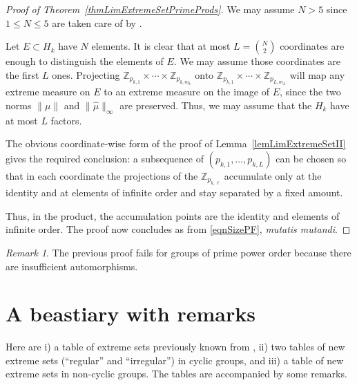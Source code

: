 \documentclass[letter,11pt]{amsart}
\numberwithin{theorem}{section}
\theoremstyle{remark}
\newtheorem{rem}[theorem]{Remark}
\numberwithin{equation}{section}
\newcommand{\lemref}[1]{Lemma~\ref{#1}}
\newcommand{\thmref}[1]{Theorem~\ref{#1}}
\newcommand\Zp[2]{\texttt{$\mathbb Z_{#1}^{\	#2}$}}
\begin{document}
\begin{proof}[Proof of \thmref{thmLimExtremeSetPrimeProds}]
We may assume $N>5$ since $1\le N\le 5$ are taken care of by 
\cite[3.1-3.3 and 3.4(ii)]{MR627683}.

Let $E\subset H_k$ have $N$ elements.
It is clear that at most $L=\binom{N}{2}$ coordinates are enough to distinguish 
the elements of $E.$  We may assume those
coordinates are  the first $L$ ones. 
Projecting $\Zp{p_{k,1}}{}\times\cdots\times\Zp{p_{k, m_k}}{}$
onto $\Zp{ p_{k,1}}{} \times\cdots\times \Zp{p_{L,m_L}}{}$ 
will map any extreme measure on
$E$ to an extreme measure on the image of $E$, since  the two norms
 $\|\mu\|$ and $\|\widehat \mu\|_\infty$ are preserved.
Thus, we may assume that the $H_k$ have at most $L$ factors.

The obvious coordinate-wise 
form  of the proof of  \lemref{lemLimExtremeSetII} gives the required conclusion: a subsequence 
of $ (p_{k,1},\dots, p_{k,L})$ can be chosen so that in each coordinate the
projections of the \Zp{p_{k, \ell}}{} accumulate only at the identity and at elements of infinite order and
stay separated by a fixed amount. 

Thus, in the product, the accumulation points are the identity and elements of infinite order. The proof now concludes as
from \eqref{eqnSizePF}, \textit{mutatis mutandi}.
\end{proof}


\begin{rem}
The previous proof fails for groups of prime power order because
there are insufficient automorphisms.
\end{rem} 
\section{A beastiary with remarks}\label{secBeastiary}
Here  are i) a table of extreme sets previously known from  \cite{MR0458059,MR627683},  ii)  two tables  of new extreme sets (``regular'' and ``irregular'') in cyclic groups,
and  iii) a table of new extreme sets in non-cyclic groups. The tables are accompanied by some remarks.
\end{document}
